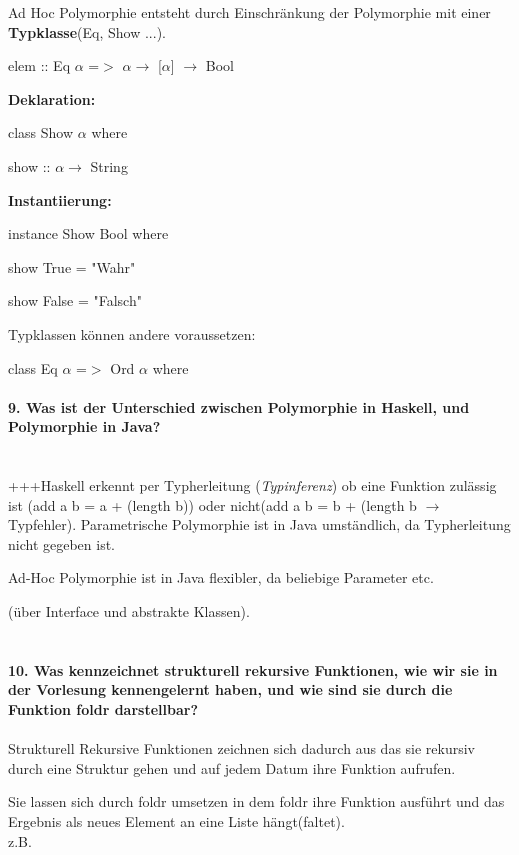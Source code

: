 \documentclass{article}
\begin{document}
Ad Hoc Polymorphie entsteht durch  Einschr\"ankung der Polymorphie mit einer \textbf{Typklasse}(Eq, Show ...).

elem :: Eq $\alpha$ =$>$ $\alpha \rightarrow$ [$\alpha$] $\rightarrow$ Bool

\textbf{Deklaration:}

class Show $\alpha$ where

show :: $\alpha \rightarrow$ String

\textbf{Instantiierung:}

instance Show Bool where

show True = "Wahr"

show False = "Falsch"

Typklassen können andere voraussetzen:

class Eq $\alpha$ =$>$ Ord $\alpha$ where
\\
\\
\textbf{9. Was ist der Unterschied zwischen Polymorphie in Haskell, und Polymorphie in Java?}
\\
\\
\\
+++Haskell erkennt per Typherleitung (\textit{Typinferenz}) ob eine Funktion zul\"assig ist (add a b = a  + (length b)) oder nicht(add a b = b  + (length b $\rightarrow$ Typfehler).
Parametrische Polymorphie ist in Java umst\"andlich, da Typherleitung nicht gegeben ist.

Ad-Hoc Polymorphie ist in Java flexibler, da beliebige Parameter etc.

(über Interface und abstrakte Klassen).
\\
\\
\\
\textbf{10. Was kennzeichnet strukturell rekursive Funktionen, wie wir sie in der Vorlesung kennengelernt haben, und wie sind sie durch die Funktion foldr darstellbar?}
\\
\\
Strukturell Rekursive Funktionen zeichnen sich dadurch aus das sie rekursiv durch eine Struktur gehen und auf jedem Datum ihre Funktion aufrufen.

Sie lassen sich durch foldr umsetzen in dem foldr ihre Funktion ausf\"uhrt und das Ergebnis als neues Element an eine Liste h\"angt(faltet).
\\
z.B.
\end{document}
